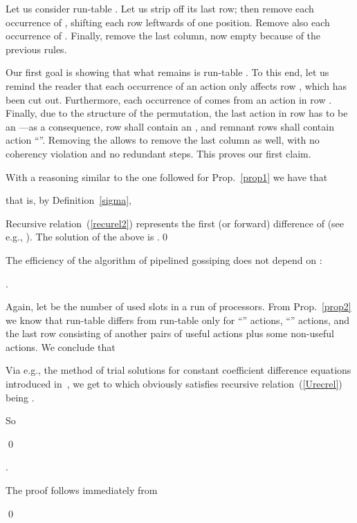 \documentclass{elsart}
\begin{document}
\begin{prop}\label{prop2}

\end{prop}
\begin{pf}

Let us consider run-table . Let us strip off its last row; then remove 
each occurrence of , shifting each row leftwards of one 
position.
Remove also each occurrence of . Finally, remove the last
column, now empty because of the previous rules.

Our first goal is showing that what remains is run-table .
To this end, let us remind the reader that each occurrence of an  action only
affects row , which has been cut out. Furthermore, each occurrence of  comes from
an  action in row . Finally, due to the structure of the permutation,
the last action in row  has to be an ---as a consequence, row  shall contain
an , and remnant rows shall contain action ``''. Removing the  allows
to remove the last column as well, with no coherency violation and no redundant steps.
This proves our first claim.

With a reasoning similar to the one followed for Prop.~\ref{prop1}
we have that


that is, by Definition~\ref{sigma},


Recursive relation~(\ref{recurel2}) represents
the first (or forward) difference of  (see e.g., \cite{PaWi79}).
The solution of the above is .\qed
\end{pf}

The efficiency of the algorithm of pipelined gossiping does not depend
on :
\begin{prop}
.
\end{prop}
\begin{pf}
Again, let  be the number of used slots in a run of  processors.
From Prop.~\ref{prop2} we know that run-table  differs from run-table 
only for  ``'' actions,  ``'' actions, and the last row
consisting of another  pairs of useful actions plus some 
non-useful actions.  We conclude that 


Via e.g., the method of trial solutions for constant coefficient difference
equations introduced in~\cite[p.~16]{PaWi79}, we get to
 which obviously satisfies recursive relation~(\ref{Urecrel})
being .

So

\qed
\end{pf}

\begin{prop}
.
\end{prop}
\begin{pf}
The proof follows immediately from 

\qed
\end{pf}
\end{document}
